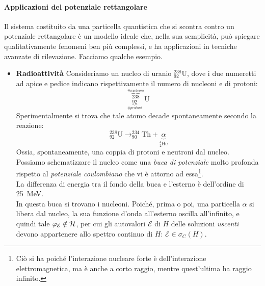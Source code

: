 \documentclass[../../FisicaTeorica.tex]{subfiles}
\begin{document}

\paragraph{Applicazioni del potenziale rettangolare\\}
Il sistema costituito da una particella quantistica che si scontra contro un potenziale rettangolare è un modello ideale che, nella sua semplicità, può spiegare qualitativamente fenomeni ben più complessi, e ha applicazioni in tecniche avanzate di rilevazione. Facciamo qualche esempio.
\begin{itemize}
\item 
\textbf{Radioattività} Consideriamo un nucleo di uranio $^{238}_{92}\mathrm{U}$, dove i due numeretti ad apice e pedice indicano rispettivamente il numero di nucleoni e di protoni:
\[
^{\overbrace{238}^{\#nucleoni}}_{\underbrace{92}_{\#protoni}}\mathrm{U}
\]
Sperimentalmente si trova che tale atomo decade spontaneamente secondo la reazione:
\[
^{238}_{92}\mathrm{U} \to ^{234}_{90}\mathrm{Th}+\underbrace{\alpha}_{^4_2 \mathrm{He}}
\]
Ossia, spontaneamente, una coppia di protoni e neutroni  dal nucleo.\\
Possiamo schematizzare il nucleo come una \textit{buca di potenziale} molto profonda rispetto al \textit{potenziale coulombiano} che vi è attorno ad essa\footnote{Ciò si ha poiché l'interazione nucleare forte è  dell'interazione elettromagnetica, ma è anche a corto raggio, mentre quest'ultima ha raggio infinito.}.\\
La differenza di energia tra il fondo della buca e l'esterno è dell'ordine di \SI{25}{\mega\eV}.\\
In questa buca si trovano i nucleoni. Poiché, prima o poi, una particella $\alpha$ si libera dal nucleo, la sua funzione d'onda all'esterno oscilla all'infinito, e quindi tale $\varphi_\mathcal{E} \notin \mathcal{H}$, per cui gli autovalori $\mathcal{E}$ di $H$ delle soluzioni \textit{uscenti} devono appartenere allo spettro continuo di $H$: $\mathcal{E}\in \sigma_C(H)$.\\

\end{itemize}
\end{document}
